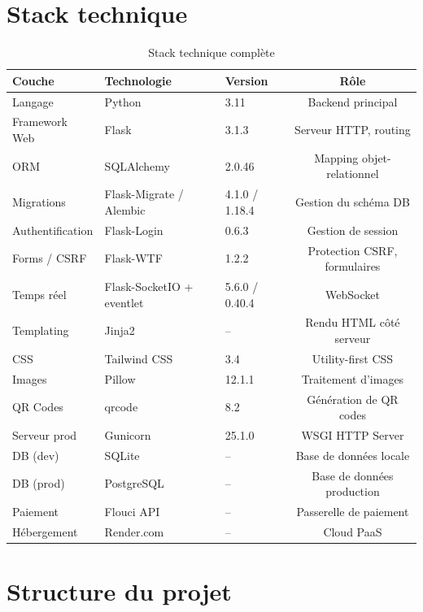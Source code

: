\documentclass[12pt,a4paper]{report}
\begin{document}
\section{Stack technique}

\begin{table}[H]
    \centering
    \caption{Stack technique complète}
    \label{tab:stack}
    \begin{tabularx}{\textwidth}{lXlc}
        \toprule
        \textbf{Couche} & \textbf{Technologie} & \textbf{Version} & \textbf{Rôle} \\
        \midrule
        Langage & Python & 3.11 & Backend principal \\
        Framework Web & Flask & 3.1.3 & Serveur HTTP, routing \\
        ORM & SQLAlchemy & 2.0.46 & Mapping objet-relationnel \\
        Migrations & Flask-Migrate / Alembic & 4.1.0 / 1.18.4 & Gestion du schéma DB \\
        Authentification & Flask-Login & 0.6.3 & Gestion de session \\
        Forms / CSRF & Flask-WTF & 1.2.2 & Protection CSRF, formulaires \\
        Temps réel & Flask-SocketIO + eventlet & 5.6.0 / 0.40.4 & WebSocket \\
        Templating & Jinja2 & -- & Rendu HTML côté serveur \\
        CSS & Tailwind CSS & 3.4 & Utility-first CSS \\
        Images & Pillow & 12.1.1 & Traitement d'images \\
        QR Codes & qrcode & 8.2 & Génération de QR codes \\
        Serveur prod & Gunicorn & 25.1.0 & WSGI HTTP Server \\
        DB (dev) & SQLite & -- & Base de données locale \\
        DB (prod) & PostgreSQL & -- & Base de données production \\
        Paiement & Flouci API & -- & Passerelle de paiement \\
        Hébergement & Render.com & -- & Cloud PaaS \\
        \bottomrule
    \end{tabularx}
\end{table}

\section{Structure du projet}
\end{document}
